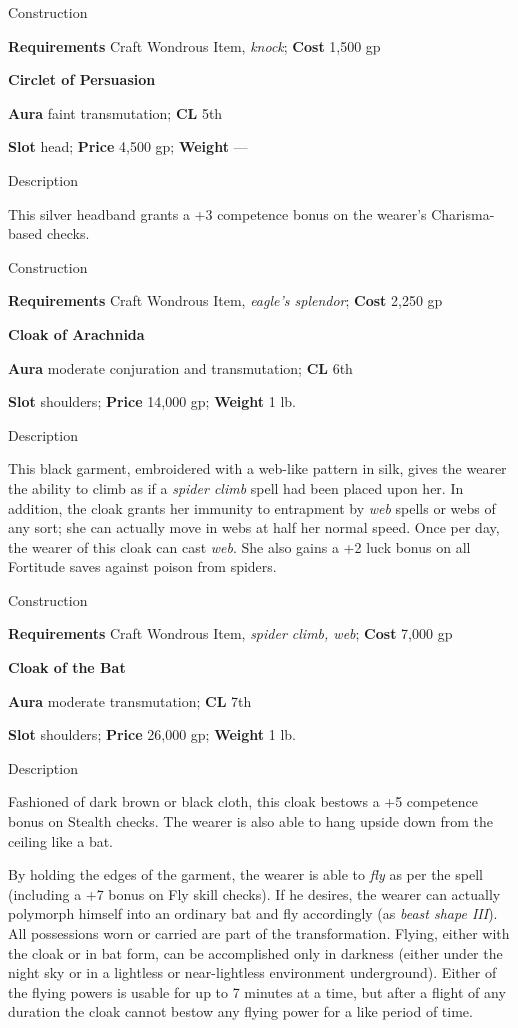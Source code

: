 Construction
				
\textbf{Requirements} Craft Wondrous Item, \textit{knock}; \textbf{Cost }1,500 gp
				
\textbf{Circlet of Persuasion}
				
\textbf{Aura} faint transmutation;\textbf{ CL }5th
				
\textbf{Slot} head; \textbf{Price} 4,500 gp; \textbf{Weight }---
				
Description
				
This silver headband grants a +3 competence bonus on the wearer's Charisma-based checks. 
				
Construction
				
\textbf{Requirements} Craft Wondrous Item, \textit{eagle's splendor}; \textbf{Cost }2,250 gp
				
\textbf{Cloak of Arachnida}
				
\textbf{Aura} moderate conjuration and transmutation;\textbf{ CL }6th
				
\textbf{Slot} shoulders; \textbf{Price} 14,000 gp; \textbf{Weight} 1 lb.
				
Description
				
This black garment, embroidered with a web-like pattern in silk, gives the wearer the ability to climb as if a \textit{spider climb }spell had been placed upon her. In addition, the cloak grants her immunity to entrapment by \textit{web }spells or webs of any sort; she can actually move in webs at half her normal speed. Once per day, the wearer of this cloak can cast \textit{web}. She also gains a +2 luck bonus on all Fortitude saves against poison from spiders. 
				
Construction
				
\textbf{Requirements} Craft Wondrous Item, \textit{spider climb, web}; \textbf{Cost }7,000 gp
				
\textbf{Cloak of the Bat}
				
\textbf{Aura} moderate transmutation;\textbf{ CL }7th
				
\textbf{Slot} shoulders; \textbf{Price} 26,000 gp; \textbf{Weight} 1 lb.
				
Description
				
Fashioned of dark brown or black cloth, this cloak bestows a +5 competence bonus on Stealth checks. The wearer is also able to hang upside down from the ceiling like a bat.
				
By holding the edges of the garment, the wearer is able to \textit{fly }as per the spell (including a +7 bonus on Fly skill checks). If he desires, the wearer can actually polymorph himself into an ordinary bat and fly accordingly (as \textit{beast shape III}). All possessions worn or carried are part of the transformation. Flying, either with the cloak or in bat form, can be accomplished only in darkness (either under the night sky or in a lightless or near-lightless environment underground). Either of the flying powers is usable for up to 7 minutes at a time, but after a flight of any duration the cloak cannot bestow any flying power for a like period of time. 
				

